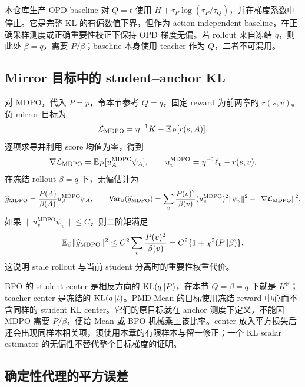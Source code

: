 本仓库生产 OPD baseline 对 $Q=t$ 使用 $H+\tau_P\log(\tau_P/\tau_Q)$，并在梯度系数中停止。它是完整 KL 的有偏数值下界，但作为 action-independent baseline，在正确采样测度或正确重要性校正下保持 OPD 梯度无偏。若 rollout 来自冻结 $q$，则此处 $\beta=q$，需要 $P/\beta$；baseline 本身使用 teacher 作为 $Q$，二者不可混用。

\subsection{Mirror 目标中的 student--anchor KL}

对 MDPO，代入 $P=p$，令本节参考 $Q=q$，固定 reward 为前两章的 $r(s,v)$。负 mirror 目标为
\begin{equation*}
 \mathcal L_{\mathrm{MDPO}}
 =\eta^{-1}K-\mathbb E_P[r(s,A)].
\end{equation*}
逐项求导并利用 score 均值为零，得到
\begin{equation*}
 \nabla\mathcal L_{\mathrm{MDPO}}
 =\mathbb E_P[u_A^{\mathrm{MDPO}}\psi_A],\qquad
 u_v^{\mathrm{MDPO}}=\eta^{-1}\ell_v-r(s,v).
\end{equation*}
在冻结 rollout $\beta=q$ 下，无偏估计为
\begin{equation*}
 \widehat g_{\mathrm{MDPO}}=\frac{P(A)}{\beta(A)}u_A^{\mathrm{MDPO}}\psi_A,\qquad
 \operatorname{Var}_\beta(\widehat g_{\mathrm{MDPO}})
 =\sum_v\frac{P(v)^2}{\beta(v)}(u_v^{\mathrm{MDPO}})^2\lVert \psi_v\rVert^2
  -\lVert\nabla\mathcal L_{\mathrm{MDPO}}\rVert^2.
\end{equation*}
如果 $\lVert u_v^{\mathrm{MDPO}}\psi_v\rVert\leq C$，则二阶矩满足
\begin{equation}
 \mathbb E_\beta\lVert\widehat g_{\mathrm{MDPO}}\rVert^2
 \leq C^2\sum_v\frac{P(v)^2}{\beta(v)}
 =C^2\{1+\chi^2(P\Vert\beta)\}.
 \label{est:eq:mdpo-variance}
\end{equation}
这说明 stale rollout 与当前 student 分离时的重要性权重代价。

BPO 的 student center 是相反方向的 $\operatorname{KL}(q\Vert P)$，在本节 $Q=\beta=q$ 下就是 $K^{\mathrm F}$；teacher center 是冻结的 $\operatorname{KL}(q\Vert t)$。PMD-Mean 的目标使用冻结 reward 中心而不含同样的 student KL center。它们的原目标就在 anchor 测度下定义，不能因 MDPO 需要 $P/\beta$，便给 Mean 或 BPO 机械乘上该比率。center 放入平方损失后还会出现同样本相关项，须使用本章的有限样本与留一修正；一个 KL scalar estimator 的无偏性不替代整个目标梯度的证明。

\subsection{确定性代理的平方误差}

